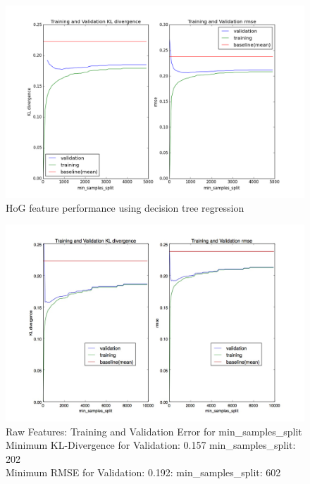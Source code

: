 \documentclass[10pt]{article}
\begin{document}
\begin{figure}
\begin{center}
\includegraphics[scale=0.4]{images/HoG_DecisionTreeCV.png}
\caption{HoG feature performance using decision tree regression}
\label{fig:hogdreval}
\end{center}
\end{figure}

\begin{figure}
\begin{center}
\includegraphics[scale=0.4]{images/Raw_Features_Decision_Tree_min_samples_split.jpg}
\caption{Raw Features: Training and Validation Error for min\_samples\_split \\
         Minimum KL-Divergence for Validation: 0.157 min\_samples\_split: 202 \\
         Minimum RMSE for Validation: 0.192: min\_samples\_split: 602}
\label{fig:rawdreval}
\end{center}
\end{figure}
\end{document}
